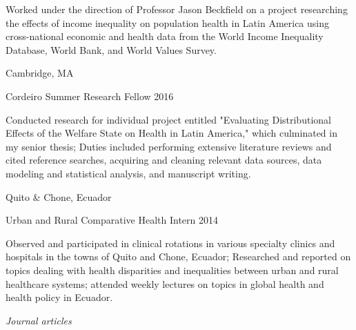 \documentclass[11pt,article,oneside]{memoir}
\begin{document}
{\noindent \footnotesize Worked under the direction of Professor Jason Beckfield on a project researching the effects of income
inequality on population health in Latin America using cross-national economic and health data from the
World Income Inequality Database, World Bank, and World Values Survey.}

\bigskip

 \hfill Cambridge, MA

\ind Cordeiro Summer Research Fellow\vspace{0.02in} \hfill 2016

{\noindent \footnotesize Conducted research for individual project entitled "Evaluating Distributional Effects of the Welfare State on
Health in Latin America," which culminated in my senior thesis; Duties included performing extensive
literature reviews and cited reference searches, acquiring and cleaning relevant data sources, data modeling
and statistical analysis, and manuscript writing.}

\bigskip

 \hfill Quito \& Chone, Ecuador

\ind Urban and Rural Comparative Health Intern\vspace{0.02in} \hfill 2014

{\noindent \footnotesize Observed and participated in clinical rotations in various specialty clinics and hospitals in the towns of Quito
and Chone, Ecuador; Researched and reported on topics dealing with health disparities and inequalities between urban and rural healthcare systems; 
attended weekly lectures on topics in global health and health policy in Ecuador.}

\newpage

\medskip

\noindent\emph{Journal articles \vspace{0.05in}}


\end{document}

